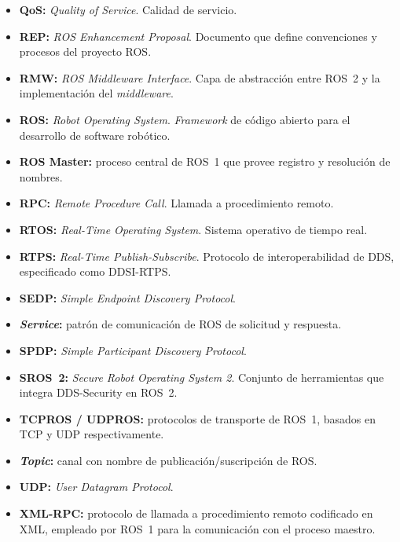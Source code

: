 \documentclass[DOC]{UTNLSE}
\begin{document}
\begin{itemize}
    \item \textbf{QoS:} \textit{Quality of Service}. Calidad de servicio.
    \item \textbf{REP:} \textit{ROS Enhancement Proposal}. Documento que
    define convenciones y procesos del proyecto ROS.
    \item \textbf{RMW:} \textit{ROS Middleware Interface}. Capa de abstracción
    entre ROS~2 y la implementación del \textit{middleware}.
    \item \textbf{ROS:} \textit{Robot Operating System}. \textit{Framework} de
    código abierto para el desarrollo de software robótico.
    \item \textbf{ROS Master:} proceso central de ROS~1 que provee registro y
    resolución de nombres.
    \item \textbf{RPC:} \textit{Remote Procedure Call}. Llamada a procedimiento
    remoto.
    \item \textbf{RTOS:} \textit{Real-Time Operating System}. Sistema operativo
    de tiempo real.
    \item \textbf{RTPS:} \textit{Real-Time Publish-Subscribe}. Protocolo de
    interoperabilidad de DDS, especificado como DDSI-RTPS.
    \item \textbf{SEDP:} \textit{Simple Endpoint Discovery Protocol}.
    \item \textbf{\textit{Service}:} patrón de comunicación de ROS de solicitud
    y respuesta.
    \item \textbf{SPDP:} \textit{Simple Participant Discovery Protocol}.
    \item \textbf{SROS~2:} \textit{Secure Robot Operating System 2}. Conjunto
    de herramientas que integra DDS-Security en ROS~2.
    \item \textbf{TCPROS / UDPROS:} protocolos de transporte de ROS~1, basados
    en TCP y UDP respectivamente.
    \item \textbf{\textit{Topic}:} canal con nombre de publicación/suscripción
    de ROS.
    \item \textbf{UDP:} \textit{User Datagram Protocol}.
    \item \textbf{XML-RPC:} protocolo de llamada a procedimiento remoto
    codificado en XML, empleado por ROS~1 para la comunicación con el proceso
    maestro.
\end{itemize}

\end{document}

